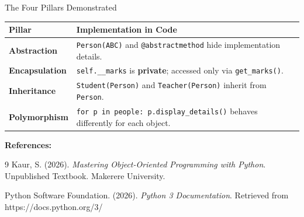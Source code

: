 \documentclass{beamer}
\begin{document}
	\begin{frame}{The Four Pillars Demonstrated}
		
		\begin{center}
			\begin{tabular}{|p{}|p{}|}
				\hline
				\textbf{Pillar} & \textbf{Implementation in Code} \\
				\hline
				\hline
				{\color{abstraction}\textbf{Abstraction}} & \texttt{Person(ABC)} and \texttt{@abstractmethod} hide implementation details. \\
				\hline
				{\color{encapsulation}\textbf{Encapsulation}} & \texttt{self.\_\_marks} is \textbf{private}; accessed only via \texttt{get\_marks()}. \\
				\hline
				{\color{inheritance}\textbf{Inheritance}} & \texttt{Student(Person)} and \texttt{Teacher(Person)} inherit from \texttt{Person}. \\
				\hline
				{\color{polymorphism}\textbf{Polymorphism}} & \texttt{for p in people: p.display\_details()} behaves differently for each object. \\
				\hline
			\end{tabular}
		\end{center}
		
		\vspace{0.1cm}
		
		\noindent \textbf{References:}
		\vspace{0.05cm}
		
		\begin{thebibliography}{9}
			Kaur, S. (2026). \textit{Mastering Object-Oriented Programming with Python}. Unpublished Textbook. Makerere University.
			
			Python Software Foundation. (2026). \textit{Python 3 Documentation}. 
			Retrieved from https://docs.python.org/3/
		\end{thebibliography}
		
	\end{frame}
	
\end{document}
